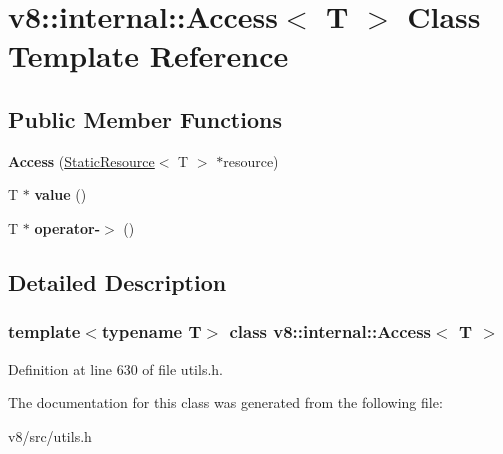 \hypertarget{classv8_1_1internal_1_1Access}{}\section{v8\+:\+:internal\+:\+:Access$<$ T $>$ Class Template Reference}
\label{classv8_1_1internal_1_1Access}
\subsection*{Public Member Functions}
\begin{DoxyCompactItemize}
\item 
\mbox{\label{classv8_1_1internal_1_1Access_a73d4e4a39835cc3d2314a328d80d0073}} 
{\bfseries Access} (\mbox{\hyperlink{classv8_1_1internal_1_1StaticResource}{Static\+Resource}}$<$ T $>$ $\ast$resource)
\item 
\mbox{\label{classv8_1_1internal_1_1Access_ab9a3512d394b376ccba107df5f3c3d67}} 
T $\ast$ {\bfseries value} ()
\item 
\mbox{\label{classv8_1_1internal_1_1Access_a71f5c7a9a355f726f309a13a5b6a8ab4}} 
T $\ast$ {\bfseries operator-\/$>$} ()
\end{DoxyCompactItemize}


\subsection{Detailed Description}
\subsubsection*{template$<$typename T$>$\newline
class v8\+::internal\+::\+Access$<$ T $>$}



Definition at line 630 of file utils.\+h.



The documentation for this class was generated from the following file\+:\begin{DoxyCompactItemize}
\item 
v8/src/utils.\+h\end{DoxyCompactItemize}
